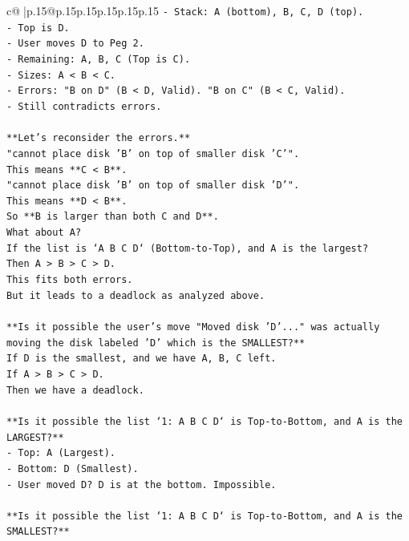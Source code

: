 \documentclass{article}
\begin{document}
{\begin{supertabular}{c@{$\;$}|p{.15\linewidth}@{}p{.15\linewidth}p{.15\linewidth}p{.15\linewidth}p{.15\linewidth}p{.15\linewidth}}
{{{\texttt{{-} Stack: A (bottom), B, C, D (top).} \\
\texttt{{-} Top is D.} \\
\texttt{{-} User moves D to Peg 2.} \\
\texttt{{-} Remaining: A, B, C (Top is C).} \\
\texttt{{-} Sizes: A < B < C.} \\
\texttt{{-} Errors: "B on D" (B < D, Valid). "B on C" (B < C, Valid).} \\
\texttt{{-} Still contradicts errors.} \\
\\ 
\texttt{**Let's reconsider the errors.**} \\
\texttt{"cannot place disk 'B' on top of smaller disk 'C'".} \\
\texttt{This means **C < B**.} \\
\texttt{"cannot place disk 'B' on top of smaller disk 'D'".} \\
\texttt{This means **D < B**.} \\
\texttt{So **B is larger than both C and D**.} \\
\texttt{What about A?} \\
\texttt{If the list is `A B C D` (Bottom{-}to{-}Top), and A is the largest?} \\
\texttt{Then A > B > C > D.} \\
\texttt{This fits both errors.} \\
\texttt{But it leads to a deadlock as analyzed above.} \\
\\ 
\texttt{**Is it possible the user's move "Moved disk 'D'..." was actually moving the disk labeled 'D' which is the SMALLEST?**} \\
\texttt{If D is the smallest, and we have A, B, C left.} \\
\texttt{If A > B > C > D.} \\
\texttt{Then we have a deadlock.} \\
\\ 
\texttt{**Is it possible the list `1: A B C D` is Top{-}to{-}Bottom, and A is the LARGEST?**} \\
\texttt{{-} Top: A (Largest).} \\
\texttt{{-} Bottom: D (Smallest).} \\
\texttt{{-} User moved D? D is at the bottom. Impossible.} \\
\\ 
\texttt{**Is it possible the list `1: A B C D` is Top{-}to{-}Bottom, and A is the SMALLEST?**} \\
}}}
\end{supertabular}}
\end{document}
